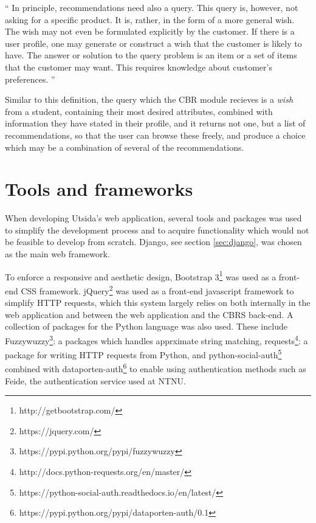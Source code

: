 \begin{displayquote}\enquote{
In principle, recommendations need also a query. This query is, however, not asking
for a specific product. It is, rather, in the form of a more general wish. The wish may
not even be formulated explicitly by the customer. If there is a user profile, one may
generate or construct a wish that the customer is likely to have.
The answer or solution to the query problem is an item or a set of items that the
customer may want. This requires knowledge about customer’s preferences.\cite{richter2013case}
}\end{displayquote}

Similar to this definition, the query which the CBR module recieves is a \emph{wish} from a student, containing their most desired attributes, combined with information they have stated in their profile, and it returns not one, but a list of recommendations, so that the user can browse these freely, and produce a choice which may be a combination of several of the recommendations.


\section{Tools and frameworks}
When developing Utsida's web application, several tools and packages was used to simplify the development process and to acquire functionality which would not be feasible to develop from scratch. Django, see section \ref{sec:django}, was chosen as the main web framework.

To enforce a responsive and aesthetic design, Bootstrap 3\footnote{http://getbootstrap.com/} was used as a front-end CSS framework. jQuery\footnote{https://jquery.com/} was used as a front-end javascript framework to simplify HTTP requests, which this system largely relies on both internally in the web application and between the web application and the CBRS back-end. A collection of packages for the Python language was also used. These include Fuzzywuzzy\footnote{https://pypi.python.org/pypi/fuzzywuzzy}: a packages which handles apprximate string matching, requests\footnote{http://docs.python-requests.org/en/master/}: a package for writing HTTP requests from Python, and python-social-auth\footnote{https://python-social-auth.readthedocs.io/en/latest/} combined with dataporten-auth\footnote{https://pypi.python.org/pypi/dataporten-auth/0.1} to enable using authentication methods such as Feide, the authentication service used at NTNU.


